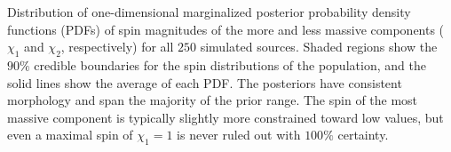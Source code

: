 \label{fig:spinPDFcred} Distribution of one-dimensional marginalized posterior probability density functions (PDFs) of spin magnitudes of the more and less massive components ($\chi_1$ and $\chi_2$, respectively) for all $250$ simulated sources. Shaded regions show the $90\%$ credible boundaries for the spin distributions of the population, and the solid lines show the average of each PDF.  The posteriors have consistent morphology and span the majority of the prior range.  The spin of the most massive component is typically slightly more constrained toward low values, but even a maximal spin of $\chi_1 = 1$ is never ruled out with $100\%$ certainty.
  
  
  
  